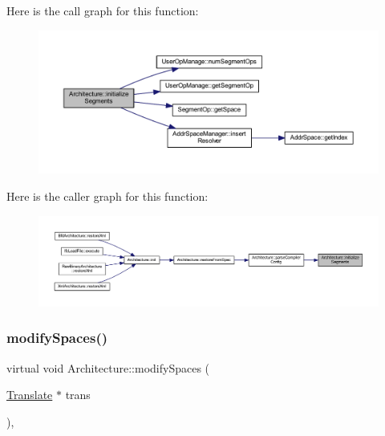 Here is the call graph for this function\+:
\nopagebreak
\begin{figure}[H]
\begin{center}
\leavevmode
\includegraphics[width=350pt]{class_architecture_a20fb7a8902a213abbf0c730fa5b6a9d7_cgraph}
\end{center}
\end{figure}
Here is the caller graph for this function\+:
\nopagebreak
\begin{figure}[H]
\begin{center}
\leavevmode
\includegraphics[width=350pt]{class_architecture_a20fb7a8902a213abbf0c730fa5b6a9d7_icgraph}
\end{center}
\end{figure}
\mbox{\label{class_architecture_aec1784d8729ba0f13cd7ea63ee546995}} 
\subsubsection{\texorpdfstring{modifySpaces()}{modifySpaces()}}
{\footnotesize\ttfamily virtual void Architecture\+::modify\+Spaces (\begin{DoxyParamCaption}\item[{\mbox{\hyperlink{class_translate}{Translate}} $\ast$}]{trans }\end{DoxyParamCaption})\hspace{0.3cm}{\ttfamily [protected]}, {}}



